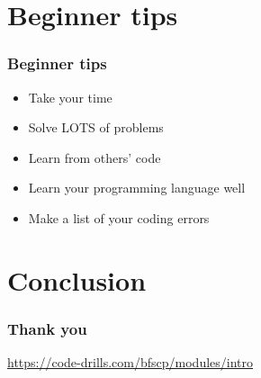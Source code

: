 \section{Beginner tips}
\begin{frame}
    \frametitle{Beginner tips}
    \begin{itemize}
        \item Take your time \\ \pause
        \item Solve LOTS of problems \\ \pause
        \item Learn from others' code \\ \pause
        \item Learn your programming language well \\ \pause
        \item Make a list of your coding errors \\
    \end{itemize}
\end{frame}

\section{Conclusion}
\begin{frame}
    \frametitle{Thank you}
    \href{https://code-drills.com/bfscp/modules/intro}{https://code-drills.com/bfscp/modules/intro}
\end{frame}


